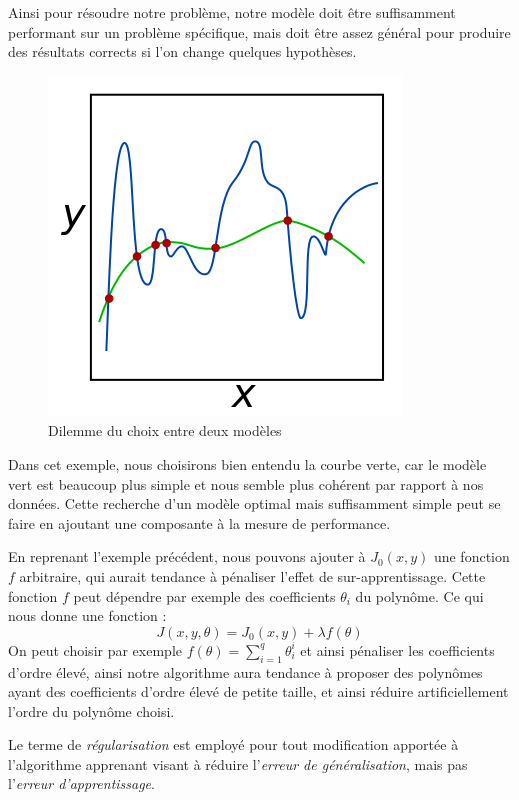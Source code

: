 \documentclass[a4paper, 11pt]{report}
\begin{document}
Ainsi pour résoudre notre problème, notre modèle doit être suffisamment performant sur un problème spécifique, mais doit être assez général pour produire des résultats corrects si l'on change quelques hypothèses.
\begin{figure}[H]
	\begin{center}
		\includegraphics[scale=0.5]{Images/Regularization.png}
		\caption{Dilemme du choix entre deux modèles}
	\end{center}
\end{figure}
Dans cet exemple, nous choisirons bien entendu la courbe verte, car le modèle vert est beaucoup plus simple et nous semble plus cohérent par rapport à nos données.
Cette recherche d'un modèle optimal mais suffisamment simple peut se faire en ajoutant une composante à la mesure de performance.

En reprenant l'exemple précédent, nous pouvons ajouter à $J_0(x,y)$ une fonction $f$ arbitraire, qui aurait tendance à pénaliser l'effet de sur-apprentissage.
Cette fonction $f$ peut dépendre par exemple des coefficients $\theta_i$ du polynôme.
Ce qui nous donne une fonction :
$$J(x,y,\theta) = J_0(x,y) + \lambda f(\theta)$$
On peut choisir par exemple $f(\theta) = \sum_{i=1}^{q}{\theta_i^i}$ et ainsi pénaliser les coefficients d'ordre élevé, ainsi notre algorithme aura tendance à proposer des polynômes ayant des coefficients d'ordre élevé de petite taille, et ainsi réduire artificiellement l'ordre du polynôme choisi.

Le terme de \emph{régularisation} est employé pour tout modification apportée à l'algorithme apprenant visant à réduire l'\emph{erreur de généralisation}, mais pas l'\emph{erreur d'apprentissage}.
	
\end{document}
